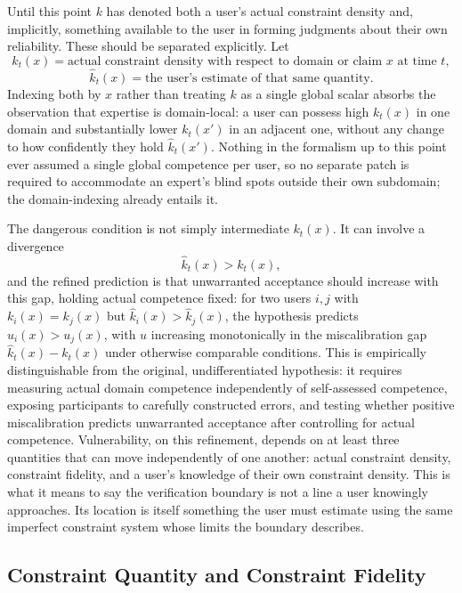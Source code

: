 \documentclass[11pt]{article}
\begin{document}
Until this point $k$ has denoted both a user's actual constraint density and, implicitly, something available to the user in forming judgments about their own reliability. These should be separated explicitly. Let
\[
k_t(x) = \text{actual constraint density with respect to domain or claim } x \text{ at time } t,
\]
\[
\hat{k}_t(x) = \text{the user's estimate of that same quantity.}
\]
Indexing both by $x$ rather than treating $k$ as a single global scalar absorbs the observation that expertise is domain-local: a user can possess high $k_t(x)$ in one domain and substantially lower $k_t(x')$ in an adjacent one, without any change to how confidently they hold $\hat{k}_t(x')$. Nothing in the formalism up to this point ever assumed a single global competence per user, so no separate patch is required to accommodate an expert's blind spots outside their own subdomain; the domain-indexing already entails it.

The dangerous condition is not simply intermediate $k_t(x)$. It can involve a divergence
\[
\hat{k}_t(x) > k_t(x),
\]
and the refined prediction is that unwarranted acceptance should increase with this gap, holding actual competence fixed: for two users $i, j$ with $k_i(x) = k_j(x)$ but $\hat{k}_i(x) > \hat{k}_j(x)$, the hypothesis predicts $u_i(x) > u_j(x)$, with $u$ increasing monotonically in the miscalibration gap $\hat{k}_t(x) - k_t(x)$ under otherwise comparable conditions. This is empirically distinguishable from the original, undifferentiated hypothesis: it requires measuring actual domain competence independently of self-assessed competence, exposing participants to carefully constructed errors, and testing whether positive miscalibration predicts unwarranted acceptance after controlling for actual competence. Vulnerability, on this refinement, depends on at least three quantities that can move independently of one another: actual constraint density, constraint fidelity, and a user's knowledge of their own constraint density. This is what it means to say the verification boundary is not a line a user knowingly approaches. Its location is itself something the user must estimate using the same imperfect constraint system whose limits the boundary describes.

\subsection{Constraint Quantity and Constraint Fidelity}
\end{document}

